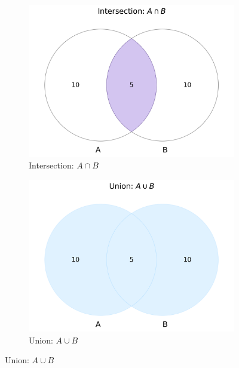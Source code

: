 \begin{figure}[h]
    \centering
    \begin{subfigure}{0.48\textwidth}
        \includegraphics[width=\textwidth]{figures/set_operations/intersection.png}
        \caption{Intersection: $A \cap B$}
        \label{fig:intersection}
    \end{subfigure}
    \hfill
    \begin{subfigure}{0.48\textwidth}
        \includegraphics[width=\textwidth]{figures/set_operations/union.png}
        \caption{Union: $A \cup B$}
        \label{fig:union}
    \end{subfigure}
    
    \vspace{0.5cm}
    

\end{figure}

